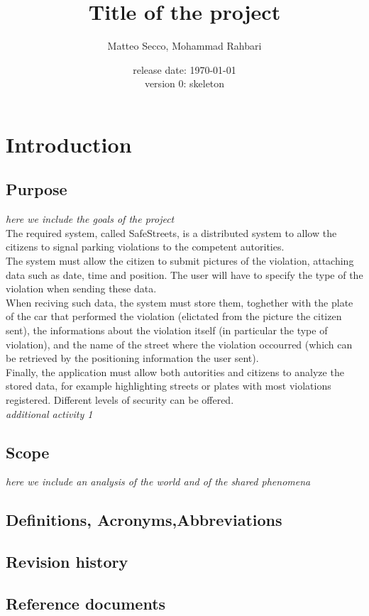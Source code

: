 \documentclass{article}
\title{Title of the project}
\date{release date: \today\\version 0: skeleton}
\author{Matteo Secco, Mohammad Rahbari}
\begin{document}
\maketitle
\newpage
\tableofcontents
\pagebreak
{}
\section{Introduction}
	\subsection{Purpose} \textit{here we	 include	 the	 goals of the project}\\
The required system, called SafeStreets, is a distributed system to allow the citizens to signal parking violations to the competent autorities.\\
The system must allow the citizen to submit pictures of the violation, attaching data such as date, time and position. The user will have to specify the type of the violation when sending these data. \\
When reciving such data, the system must store them, toghether with the plate of the car that performed the violation (elictated from the picture the citizen sent), the informations about the violation itself (in particular the type of violation), and the name of the street where the violation occourred (which can be retrieved by the positioning information the user sent).\\
Finally, the application must allow both autorities and citizens to analyze the stored data, for example highlighting streets or plates with most violations registered. Different levels of security can be offered.\\
\textit{additional activity 1}

	\subsection{Scope} \textit{here we include an analysis of the world and of the shared phenomena}
	\subsection{Definitions, Acronyms,Abbreviations}
	\subsection{Revision history}
	\subsection{Reference documents}
\end{document}
